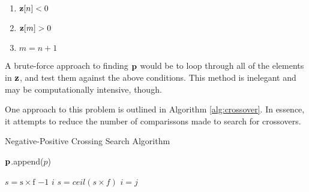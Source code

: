\begin{enumerate}
    \centering
    \item  \parbox{0.5\linewidth}{$\bm{\mathrm{z}}[n] < 0$ }
    \item  $\bm{\mathrm{z}}[m] > 0$ 
    \item $m = n+1$
\end{enumerate}

A brute-force approach to finding $\bm{\mathrm{p}}$ would be to loop through all of the
elements in $\bm{\mathrm{z}}$, and test them against the above conditions. This method
is inelegant and may be computationally intensive, though.

One approach to this problem is outlined in Algorithm \ref{alg:crossover}. In
essence, it attempts to reduce the number of comparissons made to search for
crossovers. 


\begin{algorithm}[h] 
    \caption{Negative-Positive Crossing Search Algorithm} 
    \label{alg:crossover}
    \begin{algorithmic}[1] 

	     

		 \State
		$\bm{\mathrm{p}}$.append($p$) \EndWhile 
		\State \Return {}
	\EndFunction

	\State

	    \State $s = \mathrm{s \times f}$  
	    \State \Return $-1$	  
	    \State \Return $i$ 
	    \Else
		\State $s = ceil(s \times f)$
	    \EndIf
	\Else
	    \State $i=j$
	\EndIf
	\State \Return {}
	\EndFunction 
    \end{algorithmic} 
\end{algorithm}






















